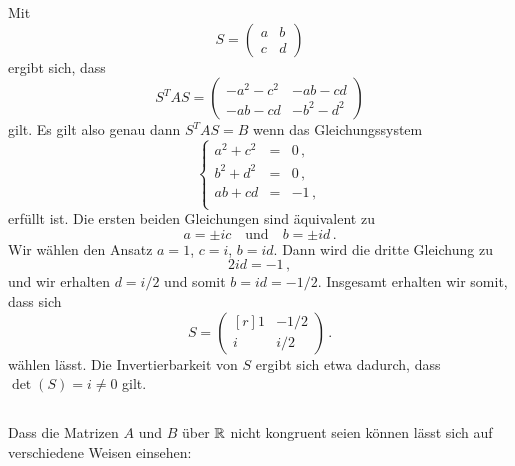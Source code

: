 \section{}





\subsection{}

Mit
\[
    S
  = \begin{pmatrix}
      a & b \\
      c & d
    \end{pmatrix}
\]
ergibt sich, dass
\[
    S^T A S
  = \begin{pmatrix}
      - a^2 - c^2 & -ab - cd    \\
      - ab - cd   & - b^2 - d^2
    \end{pmatrix}
\]
gilt.
Es gilt also genau dann $S^T A S = B$ wenn das Gleichungssystem
\[
  \left\{
    \begin{array}{rcr}
      a^2 + c^2 &=&  0 \,,  \\
      b^2 + d^2 &=&  0 \,,  \\
      ab + cd   &=& -1 \,,  \\
    \end{array}
  \right.
\]
erfüllt ist.
Die ersten beiden Gleichungen sind äquivalent zu
\[
  a = \pm i c
  \quad\text{und}\quad
  b = \pm i d \,.
\]
Wir wählen den Ansatz $a = 1$, $c = i$, $b = id$.
Dann wird die dritte Gleichung zu
\[
  2id = -1 \,,
\]
und wir erhalten $d = i/2$ und somit $b = id = -1/2$.
Insgesamt erhalten wir somit, dass sich
\[
    S
  = \begin{pmatrix*}[r]
      1 & -1/2  \\
      i &  i/2
    \end{pmatrix*} \,.
\]
wählen lässt.
Die Invertierbarkeit von $S$ ergibt sich etwa dadurch, dass $\det(S) =  i \neq 0$ gilt.





\subsection{}

Dass die Matrizen $A$ und $B$ über $\mathbb{R}$ nicht kongruent seien können lässt sich auf verschiedene Weisen einsehen:

